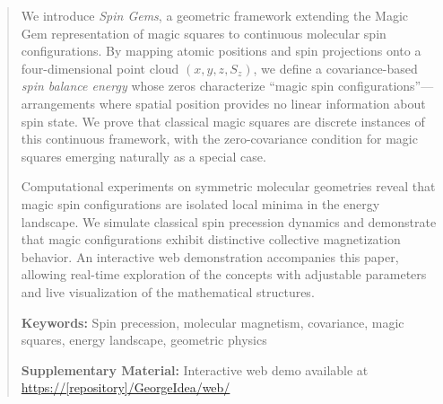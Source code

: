 \begin{abstract}
We introduce \emph{Spin Gems}, a geometric framework extending the Magic Gem representation of magic squares to continuous molecular spin configurations. By mapping atomic positions and spin projections onto a four-dimensional point cloud $(x, y, z, S_z)$, we define a covariance-based \emph{spin balance energy} whose zeros characterize ``magic spin configurations''---arrangements where spatial position provides no linear information about spin state. We prove that classical magic squares are discrete instances of this continuous framework, with the zero-covariance condition for magic squares emerging naturally as a special case.

Computational experiments on symmetric molecular geometries reveal that magic spin configurations are isolated local minima in the energy landscape. We simulate classical spin precession dynamics and demonstrate that magic configurations exhibit distinctive collective magnetization behavior. An interactive web demonstration accompanies this paper, allowing real-time exploration of the concepts with adjustable parameters and live visualization of the mathematical structures.

\medskip
\noindent\textbf{Keywords:} Spin precession, molecular magnetism, covariance, magic squares, energy landscape, geometric physics

\medskip
\noindent\textbf{Supplementary Material:} Interactive web demo available at \url{https://[repository]/GeorgeIdea/web/}
\end{abstract}

